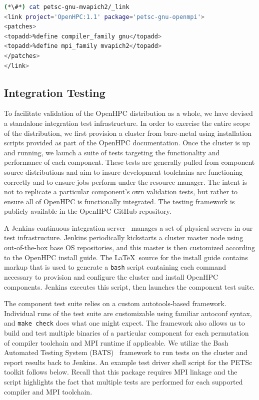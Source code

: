 \documentclass{sig-alternate-05-2015}
\begin{document}
\begin{lstlisting}[language=bash,keywords={},basicstyle=\fontsize{7.8}{10}\ttfamily,keepspaces]
(*\#*) cat petsc-gnu-mvapich2/_link
<link project='OpenHPC:1.1' package='petsc-gnu-openmpi'>
<patches>
<topadd>%define compiler_family gnu</topadd>
<topadd>%define mpi_family mvapich2</topadd>
</patches>
</link>
\end{lstlisting}

\subsection{Integration Testing} \label{sec:integ_testing}
To facilitate validation of the OpenHPC distribution as a whole, we have
devised a standalone integration test infrastructure. In order to exercise the
entire scope of the distribution, we first provision a cluster from bare-metal
using installation scripts provided as part of the OpenHPC documentation. Once
the cluster is up and running, we launch a suite of tests targeting the
functionality and performance of each component. These tests are generally
pulled from component source distributions and aim to insure development
toolchains are functioning correctly and to ensure jobs perform under the
resource manager. The intent is not to replicate a particular component's own
validation tests, but rather to ensure all of OpenHPC is functionally
integrated. The testing framework is publicly available in the OpenHPC GitHub
repository.

A Jenkins continuous integration server~\cite{jenkins_url} manages a set of 
physical servers in our test infrastructure. Jenkins periodically kickstarts a cluster 
master node using out-of-the-box base OS repositories, and this master is then 
customized according to the OpenHPC install guide. The \LaTeX\ source for the 
install guide contains markup that is used to generate a \texttt{{bash}} script 
containing each command necessary to provision and configure the cluster and install OpenHPC
components. Jenkins executes this script, then launches the component test suite.

The component test suite relies on a custom autotools-based framework.
Individual runs of the test suite are customizable using familiar autoconf
syntax, and \texttt{{make check}} does what one might expect. The framework
also allows us to build and test multiple binaries of a particular component
for each permutation of compiler toolchain and MPI runtime if applicable.  We
utilize the Bash Automated Testing System (BATS)~\cite{bats_url} framework to
run tests on the cluster and report results back to Jenkins. An example test
driver shell script for the PETSc toolkit follows below. Recall that this package
requires MPI linkage and the script highlights the fact that multiple tests are
performed for each supported compiler and MPI toolchain.
\end{document}
